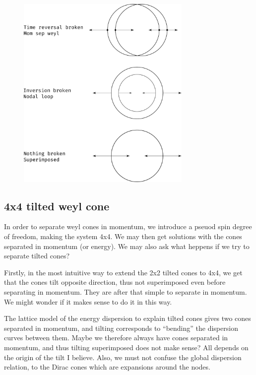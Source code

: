\begin{figure}[ht]
  \centering
  \includegraphics[width=0.75\textwidth]{figures/spinStructureWeyl}
  \caption{\label{fig:spinStructure} }
\end{figure}



\subsection{4x4 tilted weyl cone}
In order to separate weyl cones in momentum, we introduce a pseuod spin degree of freedom, making the system 4x4.
We may then get solutions with the cones separated in momentum (or energy).
We may also ask what heppens if we try to separate tilted cones?

Firstly, in the most intuitive way to extend the 2x2 tilted cones to 4x4, we get that the cones tilt opposite direction, thus not superimposed even before separating in momentum.
They are after that simple to separate in momentum.
We might wonder if it makes sense to do it in this way.

The lattice model of the energy dispersion to explain tilted cones gives two cones separated in momentum, and tilting corresponds to ``bending'' the dispersion curves between them.
Maybe we therefore always have cones separated in momentum, and thus tilting superimposed does not make sense?
All depends on the origin of the tilt I believe.
Also, we must not confuse the global dispersion relation, to the Dirac cones which are expansions around the nodes.

